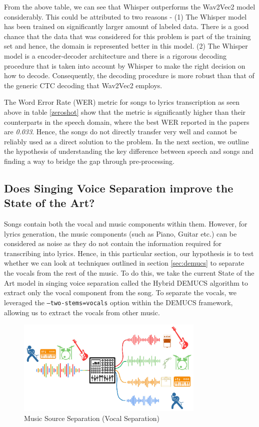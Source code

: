 From the above table, we can see that Whisper outperforms the Wav2Vec2 model considerably. This could be attributed to two reasons -  (1) The Whisper model has been trained on significantly larger amount of labeled data. There is a good chance that the data that was considered for this problem is part of the training set and hence, the domain is represented better in this model. (2) The Whisper model is a encoder-decoder architecture and there is a rigorous decoding procedure that is taken into account by Whisper to make the right decision on how to decode. Consequently, the decoding procedure is more robust than that of the generic CTC decoding that Wav2Vec2 employs.


The  Word Error Rate (WER) metric for songs to lyrics transcription as seen above in table \ref{zeroshot} show that the metric is significantly higher than their counterparts in the speech domain, where the best WER reported in the papers are \textit{0.033}. Hence, the songs do not directly transfer very well and cannot be reliably used as a direct solution to the problem. In the next section, we outline the hypothesis of understanding the key difference between speech and songs and finding a way to bridge the gap through pre-processing.

\subsection{Does Singing Voice Separation improve the State of the Art?}

Songs contain both the vocal and music components within them. However, for lyrics generation, the music components (such as Piano, Guitar etc.) can be considered as noise as they do not contain the information required for transcribing into lyrics. Hence, in this particular section, our hypothesis is to test whether we can look at techniques outlined in section \ref{sec:demucs} to separate the vocals from the rest of the music. To do this, we take the current State of the Art model in singing voice separation called the Hybrid DEMUCS algorithm to extract only the vocal component from the song. To separate the vocals, we leveraged the \texttt{--two-stems=vocals} option within the DEMUCS framework, allowing us to extract the vocals from other music.

\begin{figure}
    \centering
    \includegraphics[width=0.8\textwidth]{05-research study/figures/sourceseparation.pdf}
    \caption{Music Source Separation (Vocal Separation) \cite{opensourceseparation:book}}
    \label{fig:musicsourceseparation}
\end{figure}

